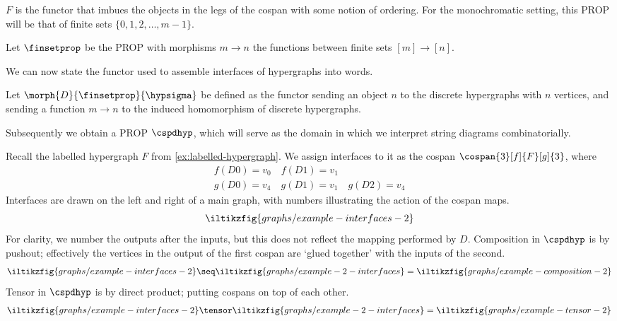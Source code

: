 \(F\) is the functor that imbues the objects in the legs of the cospan with
some notion of ordering.
For the monochromatic setting, this PROP will be that of finite sets
\(\{0,1,2,\dots,m-1\}\).

\begin{definition}
    Let \(\finsetprop\) be the PROP with morphisms \(m \to n\) the functions
    between finite sets \([m] \to [n]\).
\end{definition}

We can now state the functor used to assemble interfaces of hypergraphs into
words.

\begin{definition}
    Let \(\morph{D}{\finsetprop}{\hypsigma}\) be defined as the functor sending
    an object \(n\) to the discrete hypergraphs with \(n\) vertices, and sending
    a function \(m \to n\) to the induced homomorphism of discrete
    hypergraphs.
\end{definition}


Subsequently we obtain a PROP \(\cspdhyp\), which will serve as the domain in
which we interpret string diagrams
combinatorially.

\begin{example}
    Recall the labelled hypergraph \(F\) from \cref{ex:labelled-hypergraph}.
    We assign interfaces to it as the cospan \(\cospan{3}[f]{F}[g]{3}\), where
    \begin{gather*}
        f(D0) = v_0 \quad f(D1) = v_1 \\
        g(D0) = v_4 \quad g(D1) = v_1 \quad g(D2) = v_4
    \end{gather*}
    Interfaces are drawn on the left and right of a main graph, with numbers
    illustrating the action of the cospan maps.
    \[
        \iltikzfig{graphs/example-interfaces-2}
    \]
    For clarity, we number the outputs after the inputs, but this does not
    reflect the mapping performed by \(D\).
    Composition in \(\cspdhyp\) is by pushout; effectively the vertices in the
    output of the first cospan are `glued together' with the inputs of the
    second.
    \begin{gather*}
        \iltikzfig{graphs/example-interfaces-2}
        \seq
        \iltikzfig{graphs/example-2-interfaces}
        =
        \iltikzfig{graphs/example-composition-2}
    \end{gather*}
    Tensor in \(\cspdhyp\) is by direct product; putting cospans on top of each
    other.
    \[
        \iltikzfig{graphs/example-interfaces-2}
        \tensor
        \iltikzfig{graphs/example-2-interfaces}
        =
        \iltikzfig{graphs/example-tensor-2}
    \]
\end{example}

